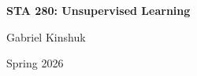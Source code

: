 \documentclass[11pt]{article}
\theoremstyle{definition}
\theoremstyle{plain}
\begin{document}
\begin{titlepage}
    \centering
    \vspace*{3cm}
    {\Huge\bfseries STA 280: Unsupervised Learning \par}
    \vspace{1.5cm}
    {\Large Gabriel Kinshuk \par}
    \vfill
    {\large Spring 2026 \par}
\end{titlepage}

\tableofcontents
\clearpage

\newpage











\newpage

\end{document}
